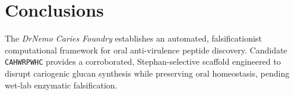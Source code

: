 \documentclass[11pt,a4paper]{article}
\begin{document}
\section{Conclusions}

The \textit{DrNemo Caries Foundry} establishes an automated, falsificationist computational framework for oral anti-virulence peptide discovery. Candidate \texttt{CAHWRPWHC} provides a corroborated, Stephan-selective scaffold engineered to disrupt cariogenic glucan synthesis while preserving oral homeostasis, pending wet-lab enzymatic falsification.



\end{document}
